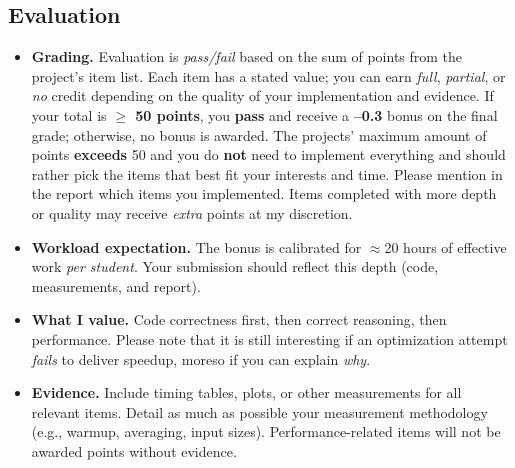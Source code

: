\subsection*{Evaluation}
\begin{itemize}
    \item \textbf{Grading.} Evaluation is \emph{pass/fail} based on the sum of points from the project's item list.
        Each item has a stated value; you can earn \emph{full}, \emph{partial}, or \emph{no} credit depending on the quality of your implementation and evidence.
        If your total is \textbf{$\geq$ 50 points}, you \textbf{pass} and receive a \textbf{--0.3} bonus on the final grade; otherwise, no bonus is awarded.
        The projects' maximum amount of points \textbf{exceeds} 50 and you do \textbf{not} need to implement everything and should rather pick the items that best fit your interests and time.
        Please mention in the report which items you implemented.
        Items completed with more depth or quality may receive \emph{extra} points at my discretion.
    \item \textbf{Workload expectation.} The bonus is calibrated for \(\approx\)20 hours of effective work \emph{per student}. Your submission should reflect this depth (code, measurements, and report).
    \item \textbf{What I value.} Code correctness first, then correct reasoning, then performance.
        Please note that it is still interesting if an optimization attempt \emph{fails} to deliver speedup, moreso if you can explain \emph{why}.
    \item \textbf{Evidence.} Include timing tables, plots, or other measurements for all relevant items.
        Detail as much as possible your measurement methodology (e.g., warmup, averaging, input sizes).
        Performance-related items will not be awarded points without evidence.
\end{itemize}

